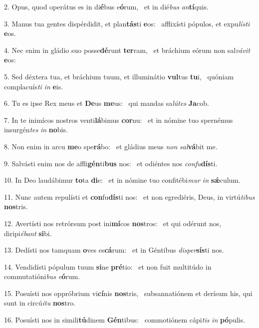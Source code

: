 2. Opus, quod operátus es in di\textbf{é}bus e\textbf{ó}rum, \ast\  et in dié\textit{bus} \textit{an}\textbf{tí}quis.\

3. Manus tua gentes dispérdidit, et plan\textbf{tás}ti \textbf{e}os: \ast\  afflixísti pópulos, et expu\textit{lís}\textit{ti} \textbf{e}os.\

4. Nec enim in gládio suo posse\textbf{dé}runt \textbf{ter}ram, \ast\  et bráchium eórum non sal\textit{vá}\textit{vit} \textbf{e}os:\

5. Sed déxtera tua, et bráchium tuum, et illuminátio \textbf{vul}tus \textbf{tu}i, \ast\  quóniam complacuís\textit{ti} \textit{in} \textbf{e}is.\

6. Tu es ipse Rex meus et \textbf{De}us \textbf{me}us: \ast\  qui mandas sa\textit{lú}\textit{tes} \textbf{Ja}cob.\

7. In te inimícos nostros venti\textbf{lá}bimus \textbf{cor}nu: \ast\  et in nómine tuo spernémus insurgén\textit{tes} \textit{in} \textbf{no}bis.\

8. Non enim in arcu \textbf{me}o spe\textbf{rá}bo: \ast\  et gládius meus \textit{non} \textit{sal}\textbf{vá}bit me.\

9. Salvásti enim nos de affli\textbf{gén}ti\textbf{bus} nos: \ast\  et odiéntes nos \textit{con}\textit{fu}\textbf{dís}ti.\

10. In Deo laudábimur \textbf{to}ta \textbf{di}e: \ast\  et in nómine tuo confitébi\textit{mur} \textit{in} \textbf{sǽ}culum.\

11. Nunc autem repulísti et \textbf{con}fu\textbf{dís}ti nos: \ast\  et non egrediéris, Deus, in virtú\textit{ti}\textit{bus} \textbf{nos}tris.\

12. Avertísti nos retrórsum post ini\textbf{mí}cos \textbf{nos}tros: \ast\  et qui odérunt nos, diripi\textit{é}\textit{bant} \textbf{si}bi.\

13. Dedísti nos tamquam \textbf{o}ves es\textbf{cá}rum: \ast\  et in Géntibus \textit{di}\textit{sper}\textbf{sís}ti nos.\

14. Vendidísti pópulum tuum \textbf{si}ne \textbf{pré}tio: \ast\  et non fuit multitúdo in commutatióni\textit{bus} \textit{e}\textbf{ó}rum.\

15. Posuísti nos oppróbrium vi\textbf{cí}nis \textbf{nos}tris, \ast\  subsannatiónem et derísum his, qui sunt in circú\textit{i}\textit{tu} \textbf{nos}tro.\

16. Posuísti nos in simili\textbf{tú}dinem \textbf{Gén}tibus: \ast\  commotiónem cápi\textit{tis} \textit{in} \textbf{pó}pulis.\


